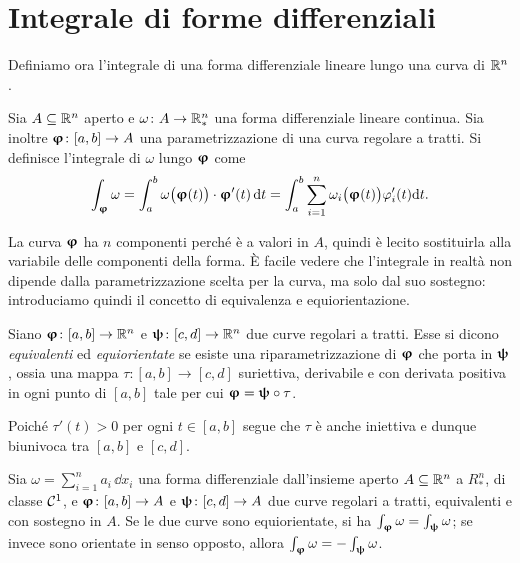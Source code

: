 \section{Integrale di forme differenziali}
Definiamo ora l'integrale di una forma differenziale lineare lungo una curva di $\mathbb{R}^n$.
\begin{definizione} \label{d:integrale-1forma}
	Sia $A\subseteq\mathbb{R}^n$ aperto e $\omega\colon A\to\mathbb{R}^n_*$ una forma differenziale lineare continua.
	Sia inoltre $\bm{\upvarphi}\colon[a,b]\to A$ una parametrizzazione di una curva regolare a tratti.
	Si definisce l'integrale di $\omega$ lungo $\bm{\upvarphi}$ come
	\begin{equation} 
		\int_{\bm{\upvarphi}}\omega=\int_a^b{\omega\big(\bm{\upvarphi}(t)\big)}\cdot{\bm{\upvarphi}'(t)}\,\textup{d} t=\int_a^b\sum_{i=1}^n\omega_i\big(\bm{\upvarphi}(t)\big)\varphi_i'(t)\textup{d} t.
		\label{eq:integrale-1forma}
	\end{equation}
\end{definizione}
	La curva $\bm{\upvarphi}$ ha $n$ componenti perch\'e è a valori in $A$, quindi è lecito sostituirla alla variabile delle componenti della forma.
	È facile vedere che l'integrale in realtà non dipende dalla parametrizzazione scelta per la curva, ma solo dal suo sostegno: introduciamo quindi il concetto di equivalenza e equiorientazione.
\begin{definizione}
	Siano $\bm{\upvarphi}\colon[a,b]\to\mathbb{R}^n$ e $\bm{\uppsi}\colon[c,d]\to\mathbb{R}^n$ due curve regolari a tratti.
	Esse si dicono \emph{equivalenti} ed \emph{equiorientate} se esiste una riparametrizzazione di $\bm{\upvarphi}$ che porta in $\bm{\uppsi}$, ossia una mappa $\tau\colon[a,b]\to[c,d]$ suriettiva, derivabile e con derivata positiva in ogni punto di $[a,b]$ tale per cui $\bm{\upvarphi}=\bm{\uppsi}\circ\tau$.
\end{definizione}
Poiché $\tau'(t)>0$ per ogni $t\in[a,b]$ segue che $\tau$ è anche iniettiva e dunque biunivoca tra $[a,b]$ e $[c,d]$.
\begin{teorema}
	Sia $\omega=\sum_{i=1}^na_i\,\dd x_i$ una forma differenziale dall'insieme aperto $A\subseteq\mathbb{R}^n$ a $R^n_*$, di classe $\mathcal{C}^{{1}}$, e $\bm{\upvarphi}\colon[a,b]\to A$ e $\bm{\uppsi}\colon [c,d]\to A$ due curve regolari a tratti, equivalenti e con sostegno in $A$.
	Se le due curve sono equiorientate, si ha $\int_{\bm{\upvarphi}}\omega=\int_{\bm{\uppsi}}\omega$; se invece sono orientate in senso opposto, allora $\int_{\bm{\upvarphi}}\omega=-\int_{\bm{\uppsi}}\omega$.
\end{teorema}
